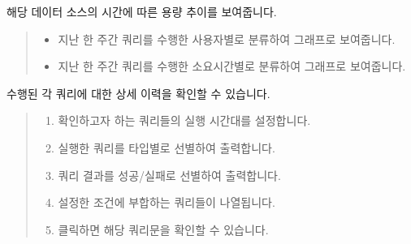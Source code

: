\documentclass[letterpaper,10pt,english]{sphinxmanual}
\begin{document}

해당 데이터 소스의 시간에 따른 용량 추이를 보여줍니다.
\begin{quote}

\begin{figure}[H]
\centering

\noindent{}
\end{figure}
\end{quote}

\begin{quote}

\begin{figure}[H]
\centering

\noindent{}
\end{figure}
\begin{itemize}
\item {} 
 지난 한 주간 쿼리를 수행한 사용자별로 분류하여 그래프로 보여줍니다.

\item {} 
 지난 한 주간 쿼리를 수행한 소요시간별로 분류하여 그래프로 보여줍니다.

\end{itemize}
\end{quote}


수행된 각 쿼리에 대한 상세 이력을 확인할 수 있습니다.
\begin{quote}

\begin{figure}[H]
\centering

\noindent{}
\end{figure}
\begin{enumerate}
\def\theenumi{\arabic{enumi}}
\def\labelenumi{\theenumi .}
\makeatletter\def\p@enumii{\p@enumi \theenumi .}\makeatother
\item {} 
 확인하고자 하는 쿼리들의 실행 시간대를 설정합니다.

\item {} 
 실행한 쿼리를 타입별로 선별하여 출력합니다.

\item {} 
 쿼리 결과를 성공/실패로 선별하여 출력합니다.

\item {} 
 설정한 조건에 부합하는 쿼리들이 나열됩니다.

\item {} 
 클릭하면 해당 쿼리문을 확인할 수 있습니다.

\end{enumerate}
\end{quote}
\end{document}
